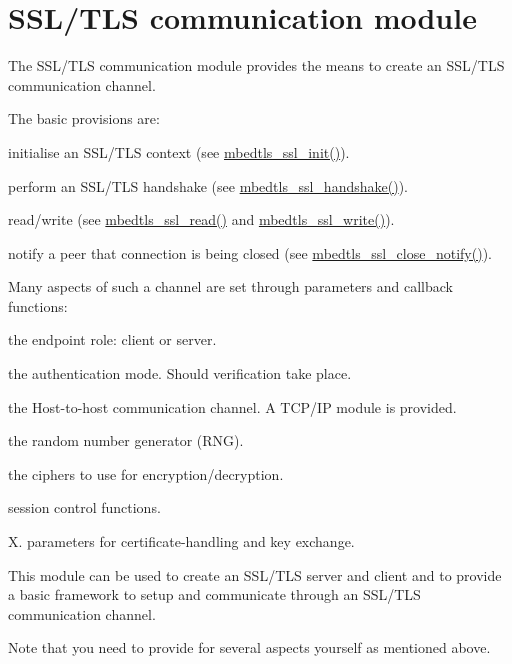 \hypertarget{group__ssltls__communication__module}{\section{S\-S\-L/\-T\-L\-S communication module}
\label{group__ssltls__communication__module}
}
The S\-S\-L/\-T\-L\-S communication module provides the means to create an S\-S\-L/\-T\-L\-S communication channel.

The basic provisions are\-:
\begin{DoxyItemize}
\item initialise an S\-S\-L/\-T\-L\-S context (see {\ttfamily \hyperlink{ssl_8h_a8560dea66d7830a11874188727ec4c45}{mbedtls\-\_\-ssl\-\_\-init()}}).
\item perform an S\-S\-L/\-T\-L\-S handshake (see {\ttfamily \hyperlink{ssl_8h_a4a37e497cd08c896870a42b1b618186e}{mbedtls\-\_\-ssl\-\_\-handshake()}}).
\item read/write (see {\ttfamily \hyperlink{ssl_8h_aa2c29eeb1deaf5ad9f01a7515006ede5}{mbedtls\-\_\-ssl\-\_\-read()}} and {\ttfamily \hyperlink{ssl_8h_a5bbda87d484de82df730758b475f32e5}{mbedtls\-\_\-ssl\-\_\-write()}}).
\item notify a peer that connection is being closed (see {\ttfamily \hyperlink{ssl_8h_ac2c1b17128ead2df3082e27b603deb4c}{mbedtls\-\_\-ssl\-\_\-close\-\_\-notify()}}).
\end{DoxyItemize}

Many aspects of such a channel are set through parameters and callback functions\-:
\begin{DoxyItemize}
\item the endpoint role\-: client or server.
\item the authentication mode. Should verification take place.
\item the Host-\/to-\/host communication channel. A T\-C\-P/\-I\-P module is provided.
\item the random number generator (R\-N\-G).
\item the ciphers to use for encryption/decryption.
\item session control functions.
\item X. parameters for certificate-\/handling and key exchange.
\end{DoxyItemize}

This module can be used to create an S\-S\-L/\-T\-L\-S server and client and to provide a basic framework to setup and communicate through an S\-S\-L/\-T\-L\-S communication channel.\par
 Note that you need to provide for several aspects yourself as mentioned above. 